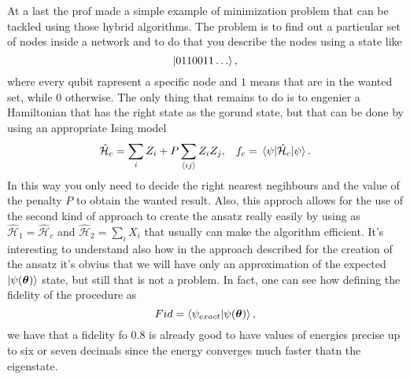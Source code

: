 {
    At a last the prof made a simple example of minimization problem that can be tackled using those hybrid algorithms. The problem is to find out a particular set of nodes inside a network and to do that you describe the nodes using a state like
    \begin{equation}
        \ket{0110011\dots},
    \end{equation}
    where every qubit rapresent a specific node and $1$ means that are in the wanted set, while $0$ otherwise. The only thing that remains to do is to engenier a Hamiltonian that has the right state as the gorund state, but that can be done by using an appropriate Ising model
    \begin{align}
        &\hat{\mathcal{H}}_c = \sum_i Z_i + P\sum_{\langle ij \rangle} Z_iZ_j, &f_c = \ev{\hat{\mathcal{H}}_c}{\psi}.
    \end{align}
    In this way you only need to decide the right nearest negihbours and the value of the penalty $P$ to obtain the wanted result. Also, this approch allows for the use of the second kind of approach to create the ansatz really easily by using as $\hat{\mathcal{H}}_1 = \hat{\mathcal{H}}_c$ and $\hat{\mathcal{H}}_2 = \sum_i X_i$ that usually can make the algorithm efficient.
}
\nt
{
    It's interesting to understand also how in the approach described for the creation of the ansatz it's obvius that we will have only an approximation of the expected $\ket{\psi(\vb*{\theta})}$ state, but still that is not a problem. In fact, one can see how defining the fidelity of the procedure as
    \begin{displaymath}
        Fid = \braket{\psi_{exact}}{\psi(\vb*{\theta})},
    \end{displaymath}
    we have that a fidelity fo $0.8$ is already good to have values of energies precise up to six or seven decimals since the energy converges much faster thatn the eigenstate.
}